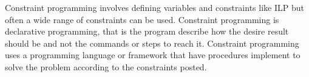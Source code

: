 Constraint programming involves defining variables and constraints like ILP but often a wide range of constraints can 
be used. Constraint programming is declarative programming, that is the program  describe how the desire result 
should be and not the commands or steps to reach it. Constraint programming uses a programming language or framework 
that have procedures implement to solve the problem according to the constraints posted.  